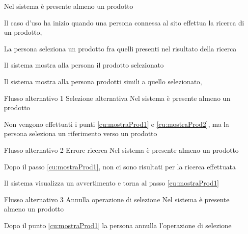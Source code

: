 {Nel sistema è presente almeno un prodotto}
{\postNulle}
{\begin{enumCU}
	\item Il caso d'uso ha inizio quando una persona connessa al sito effettua la ricerca di un prodotto, \label{cu:mostraProd1}
	\item La persona seleziona un prodotto fra quelli presenti nel risultato della ricerca\label{cu:mostraProd2}
	\item Il sistema mostra alla persona il prodotto selezionato
	\item Il sistema mostra alla persona prodotti simili a quello selezionato, 
\end{enumCU}}
%
{Flusso alternativo 1}%
{Selezione alternativa}%
{Nel sistema è presente almeno un prodotto}%
{\postNulle}%
{\begin{enumCU}
		\item Non vengono effettuati i punti \ref{cu:mostraProd1} e \ref{cu:mostraProd2}, ma la persona seleziona un \gls{riferimento} verso un prodotto
\end{enumCU}}%
%
{Flusso alternativo 2}%
{Errore ricerca}%
{Nel sistema è presente almeno un prodotto}%
{\postNulle}%
{\begin{enumCU}
		\item Dopo il passo \ref{cu:mostraProd1}, non ci sono risultati per la ricerca effettuata
		\item Il sistema visualizza un avvertimento e torna al passo \ref{cu:mostraProd1}
\end{enumCU}}%
%	
{Flusso alternativo 3}%
{Annulla operazione di selezione}%
{Nel sistema è presente almeno un prodotto}%
{\postNulle}%
{\begin{enumCU}
		\item Dopo il punto \ref{cu:mostraProd1} la persona annulla l'operazione di selezione
\end{enumCU}}%


%

